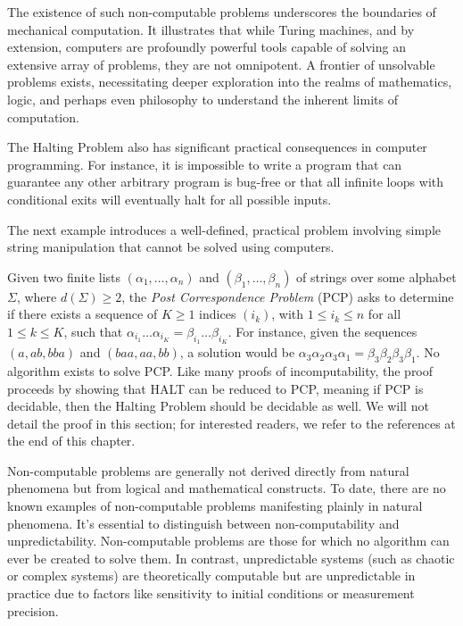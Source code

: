 The existence of such non-computable problems underscores the boundaries of mechanical computation. It illustrates that while Turing machines, and by extension, computers are profoundly powerful tools capable of solving an extensive array of problems, they are not omnipotent. A frontier of unsolvable problems exists, necessitating deeper exploration into the realms of mathematics, logic, and perhaps even philosophy to understand the inherent limits of computation.

The Halting Problem also has significant practical consequences in computer programming. For instance, it is impossible to write a program that can guarantee any other arbitrary program is bug-free or that all infinite loops with conditional exits will eventually halt for all possible inputs.

The next example introduces a well-defined, practical problem involving simple string manipulation that cannot be solved using computers.

\begin{example}
\label{ex:PCP}
Given two finite lists $\left( \alpha_1, \ldots, \alpha_n \right)$ and $\left( \beta_1, \ldots, \beta_n \right)$ of strings over some alphabet $\Sigma$, where $d(\Sigma) \ge 2$, the \emph{Post Correspondence Problem} (PCP) asks to determine if there exists a sequence of $K \geq 1$ indices $(i_k)$, with $1 \le i_k \le n$ for all $1 \le k \le K$, such that $\alpha_{i_1} \ldots \alpha_{i_K} = \beta_{i_1} \ldots \beta_{i_K}$. For instance, given the sequences $(a, ab, bba)$ and $(baa, aa, bb)$, a solution would be $\alpha_3 \alpha_2 \alpha_3 \alpha_1 = \beta_{3} \beta_{2} \beta_{3} \beta_{1}$. No algorithm exists to solve PCP. Like many proofs of incomputability, the proof proceeds by showing that HALT can be reduced to PCP, meaning if PCP is decidable, then the Halting Problem should be decidable as well. We will not detail the proof in this section; for interested readers, we refer to the references at the end of this chapter.
\end{example}

Non-computable problems are generally not derived directly from natural phenomena but from logical and mathematical constructs. To date, there are no known examples of non-computable problems manifesting plainly in natural phenomena. It's essential to distinguish between non-computability and unpredictability. Non-computable problems are those for which no algorithm can ever be created to solve them. In contrast, unpredictable systems (such as chaotic or complex systems) are theoretically computable but are unpredictable in practice due to factors like sensitivity to initial conditions or measurement precision.

